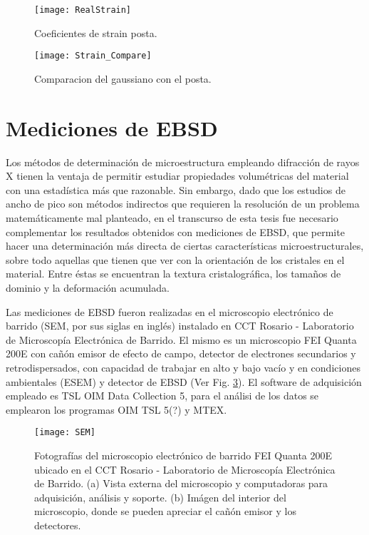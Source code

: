 \begin{figure}[!htb]
  \centering
  \texttt{[image: RealStrain]}
  \caption{Coeficientes de strain posta.}
  \label{fig:RealStrain}
\end{figure}

\begin{figure}[!htb]
  \centering
  \texttt{[image: Strain\_Compare]}
  \caption{Comparacion del gaussiano con el posta.}
  \label{fig:RealvsGauss}
\end{figure}

\newpage
\fi
\section{Mediciones de EBSD}\label{S:MatEBSD}
Los métodos de determinación de microestructura empleando difracción de rayos X tienen la ventaja de permitir estudiar propiedades volumétricas del material con una estadística más que razonable.
Sin embargo, dado que los estudios de ancho de pico son métodos indirectos que requieren la resolución de un problema matemáticamente mal planteado, en el transcurso de esta tesis fue necesario complementar los resultados obtenidos con mediciones de EBSD, que permite hacer una determinación más directa de ciertas características microestructurales, sobre todo aquellas que tienen que ver con la orientación de los cristales en el material.
Entre éstas se encuentran la textura cristalográfica, los tamaños de dominio y la deformación acumulada.

Las mediciones de EBSD fueron realizadas en el microscopio electrónico de barrido (SEM, por sus siglas en inglés) instalado en CCT Rosario - Laboratorio de Microscopía Electrónica de Barrido.
El mismo es un microscopio FEI Quanta 200E con cañón emisor de efecto de campo, detector de electrones secundarios y retrodispersados, con capacidad de trabajar en alto y bajo vacío y en condiciones ambientales (ESEM) y detector de EBSD (Ver Fig. \ref{fig:SEM}).
El software de adquisición empleado es TSL OIM Data Collection 5, para el análisi de los datos se emplearon los programas OIM TSL 5(?) y MTEX.

\begin{figure}[!htb]
  \centering
  \texttt{[image: SEM]}
  \caption{Fotografías del microscopio electrónico de barrido FEI Quanta 200E ubicado en el CCT Rosario - Laboratorio de Microscopía Electrónica de Barrido. (a) Vista externa del microscopio y computadoras para adquisición, análisis y soporte. (b) Imágen del interior del microscopio, donde se pueden apreciar el cañón emisor y los detectores.}
  \label{fig:SEM}
\end{figure}

